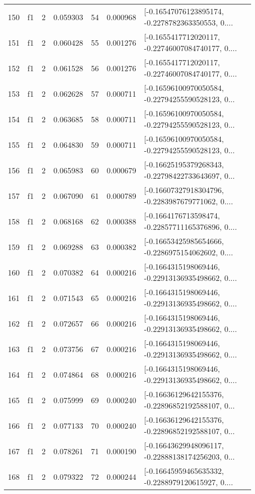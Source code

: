 \begin{tabular}{lllrlrl}
150 &  f1 &   2 &  0.059303 &   54 &  0.000968 &  [-0.16547076123895174, -0.2278782363350553, 0.... \\
151 &  f1 &   2 &  0.060428 &   55 &  0.001276 &  [-0.1655417712020117, -0.22746007084740177, 0.... \\
152 &  f1 &   2 &  0.061528 &   56 &  0.001276 &  [-0.1655417712020117, -0.22746007084740177, 0.... \\
153 &  f1 &   2 &  0.062628 &   57 &  0.000711 &  [-0.16596100970050584, -0.22794255590528123, 0... \\
154 &  f1 &   2 &  0.063685 &   58 &  0.000711 &  [-0.16596100970050584, -0.22794255590528123, 0... \\
155 &  f1 &   2 &  0.064830 &   59 &  0.000711 &  [-0.16596100970050584, -0.22794255590528123, 0... \\
156 &  f1 &   2 &  0.065983 &   60 &  0.000679 &  [-0.16625195379268343, -0.22798422733643697, 0... \\
157 &  f1 &   2 &  0.067090 &   61 &  0.000789 &  [-0.16607327918304796, -0.2283987679771062, 0.... \\
158 &  f1 &   2 &  0.068168 &   62 &  0.000388 &  [-0.1664176713598474, -0.22857711165376896, 0.... \\
159 &  f1 &   2 &  0.069288 &   63 &  0.000382 &  [-0.16653425985654666, -0.2286975154062602, 0.... \\
160 &  f1 &   2 &  0.070382 &   64 &  0.000216 &  [-0.1664315198069446, -0.22913136935498662, 0.... \\
161 &  f1 &   2 &  0.071543 &   65 &  0.000216 &  [-0.1664315198069446, -0.22913136935498662, 0.... \\
162 &  f1 &   2 &  0.072657 &   66 &  0.000216 &  [-0.1664315198069446, -0.22913136935498662, 0.... \\
163 &  f1 &   2 &  0.073756 &   67 &  0.000216 &  [-0.1664315198069446, -0.22913136935498662, 0.... \\
164 &  f1 &   2 &  0.074864 &   68 &  0.000216 &  [-0.1664315198069446, -0.22913136935498662, 0.... \\
165 &  f1 &   2 &  0.075999 &   69 &  0.000240 &  [-0.16636129642155376, -0.22896852192588107, 0... \\
166 &  f1 &   2 &  0.077133 &   70 &  0.000240 &  [-0.16636129642155376, -0.22896852192588107, 0... \\
167 &  f1 &   2 &  0.078261 &   71 &  0.000190 &  [-0.16643629948096117, -0.22888138174256203, 0... \\
168 &  f1 &   2 &  0.079322 &   72 &  0.000244 &  [-0.16645959465635332, -0.2288979120615927, 0.... \\

\end{tabular}
